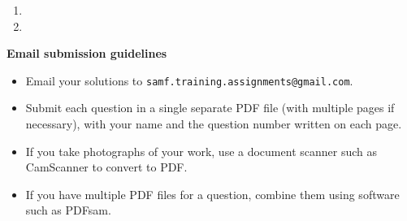 \documentclass{article}
\begin{document}
\begin{enumerate}[1.]
\vspace{6pt}
\item


\vspace{6pt}
\item %


\end{enumerate}


\vfill
\textbf{\Large Email submission guidelines}
\begin{itemize}
	\item Email your solutions to \verb!samf.training.assignments@gmail.com!.
	\item Submit each question in a single separate PDF file (with multiple pages if necessary), with your name and the question number written on each page.
	\item If you take photographs of your work, use a document scanner such as CamScanner to convert to PDF.
	\item If you have multiple PDF files for a question, combine them using software such as PDFsam.
\end{itemize}
\end{document}
